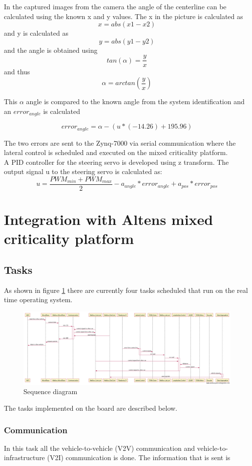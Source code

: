 In the captured images from the camera the angle of the centerline can be calculated using the known x and y values. The x in the picture is calculated as $$x = abs(x1-x2)$$ and y is calculated as $$y=abs(y1-y2)$$ and the angle is obtained using $$tan(\alpha)=\frac{y}{x}$$ and thus $$\alpha = arctan(\frac{y}{x})$$

This $\alpha$ angle is compared to the known angle from the system identification and an $error_{angle}$ is calculated

$$error_{angle} = \alpha - (u*(-14.26)+195.96)$$


The two errors are sent to the Zynq-7000 via serial communication where the lateral control is scheduled and executed on the mixed criticality platform.\\

A PID controller for the steering servo is developed using z transform. The output signal u to the steering servo is calculated as:
$$u = \frac{PWM_{min}+PWM_{max}}{2} - a_{angle}*error_{angle} + a_{pos}*error_{pos}$$

\section{Integration with Altens mixed criticality platform}
\subsection{Tasks}
As shown in figure \ref{fig:sequence diagram} there are currently four tasks scheduled that run on the real time operating system.

\begin{figure}[H]
  \includegraphics[width=\textwidth]{./img/sekvensdiagram.png}
  \centering
  \caption{Sequence diagram}
  \label{fig:sequence diagram}
\end{figure}
The tasks implemented on the board are described below.
 
\subsubsection{Communication}
In this task all the vehicle-to-vehicle (V2V) communication and vehicle-to-infrastructure (V2I) communication is done. The information that is sent is

